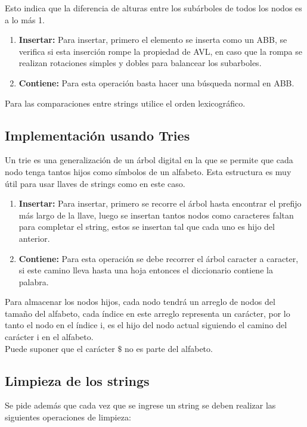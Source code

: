 \documentclass[dcc]{fcfmcourse}
\begin{document}
Esto indica que la diferencia de alturas entre los subárboles de todos los nodos es a lo más 1.

\begin{enumerate}
    \item \textbf{Insertar:} Para insertar, primero el elemento se inserta como un ABB, se verifica si esta inserción rompe la propiedad de AVL, en caso que la rompa se realizan rotaciones simples y dobles para balancear los subarboles.
    \item \textbf{Contiene:} Para esta operación basta hacer una búsqueda normal en ABB.
\end{enumerate}

Para las comparaciones entre strings utilice el orden lexicográfico.


\subsection{Implementación usando Tries}
Un trie es una generalización de un árbol digital en la que se permite que cada nodo tenga tantos hijos como símbolos de un alfabeto. Esta estructura es muy útil para usar llaves de strings como en este caso.

\begin{enumerate}
    \item \textbf{Insertar:} Para insertar, primero se recorre el árbol hasta encontrar el prefijo más largo de la llave, luego se insertan tantos nodos como caracteres faltan para completar el string, estos se insertan tal que cada uno es hijo del anterior.
    
    \item \textbf{Contiene:} Para esta operación se debe recorrer el árbol caracter a caracter, si este camino lleva hasta una hoja entonces el diccionario contiene la palabra.
\end{enumerate}

Para almacenar los nodos hijos, cada nodo tendrá un arreglo de nodos del tamaño del alfabeto, cada índice en este arreglo representa un carácter, por lo tanto el nodo en el índice i, es el hijo del nodo actual siguiendo el camino del carácter i en el alfabeto. \\

Puede suponer que el carácter $\$$ no es parte del alfabeto. 

\subsection{Limpieza de los strings}
Se pide además que cada vez que se ingrese un string se deben realizar las siguientes operaciones de limpieza:
\end{document}
